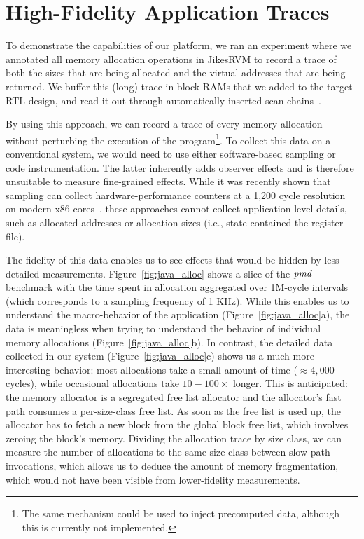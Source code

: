 \section{High-Fidelity Application Traces}

To demonstrate the capabilities of our platform, we ran an experiment where we
annotated all memory allocation operations in JikesRVM to record a trace of
both the sizes that are being allocated and the virtual addresses that are
being returned. We buffer this (long) trace in block RAMs that we added to the
target RTL design, and read it out through automatically-inserted scan
chains~\cite{strober}.

By using this approach, we can record a trace of every memory allocation
without perturbing the execution of the program\footnote{The same mechanism
could be used to inject precomputed data, although this is currently not
implemented.}. To collect this data on a conventional system, we would need to
use either software-based sampling or code instrumentation. The latter
inherently adds observer effects and is therefore unsuitable to measure
fine-grained effects. While it was recently shown that sampling can collect
hardware-performance counters at a 1,200 cycle resolution on modern x86
cores~\cite{Yang:2015:CPM:2749469.2750401}, these approaches cannot collect
application-level details, such as allocated addresses or allocation sizes
(i.e., state contained the register file).

The fidelity of this data enables us to see effects that would be hidden by
less-detailed measurements. Figure~\ref{fig:java_alloc} shows a slice of the
$\emph{pmd}$ benchmark with the time spent in allocation aggregated over
1M-cycle intervals (which corresponds to a sampling frequency of 1 KHz). While
this enables us to understand the macro-behavior of the application
(Figure~\ref{fig:java_alloc}a), the data is meaningless when trying to
understand the behavior of individual memory allocations
(Figure~\ref{fig:java_alloc}b). In contrast, the detailed data collected in our
system (Figure~\ref{fig:java_alloc}c) shows us a much more interesting
behavior: most allocations take a small amount of time ($\approx 4,000$
cycles), while occasional allocations take $10-100\times$ longer. This is
anticipated: the memory allocator is a segregated free list allocator and the
allocator's fast path consumes a per-size-class free list. As soon as the free
list is used up, the allocator has to fetch a new block from the global block
free list, which involves zeroing the block's memory. Dividing the allocation
trace by size class, we can measure the number of allocations to the same size
class between slow path invocations, which allows us to deduce the amount of
memory fragmentation, which would not have been visible from lower-fidelity
measurements.


